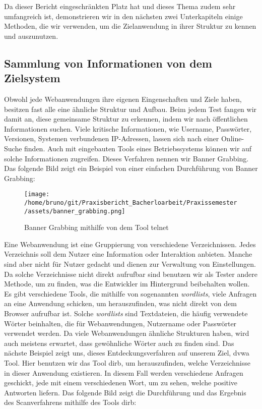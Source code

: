 Da dieser Bericht eingeschränkten Platz hat und dieses Thema zudem sehr umfangreich ist, demonstrieren wir in den nächsten zwei Unterkapiteln einige Methoden, die wir verwenden, um die Zielanwendung in ihrer Struktur zu kennen und auszunutzen.

\subsection{Sammlung von Informationen von dem Zielsystem}

Obwohl jede Webanwendungen ihre eigenen Eingenschaften und Ziele haben, besitzen fast alle eine ähnliche Struktur und Aufbau. Beim jedem Test fangen wir damit an, diese gemeinsame Struktur zu erkennen, indem wir nach öffentlichen Informationen suchen. Viele kritische Informationen, wie Username, Passwörter, Versionen, Systemen verbundenen IP-Adressen, lassen sich nach einer Online-Suche finden. Auch mit eingebauten Tools eines Betriebssystems können wir auf solche Informationen zugreifen. Dieses Verfahren nennen wir Banner Grabbing. Das folgende Bild zeigt ein Beispiel von einer einfachen Durchführung von Banner Grabbing:

\begin{figure}[H]
    \centering
    \texttt{[image: /home/bruno/git/Praxisbericht\_Bacherloarbeit/Praxissemester/assets/banner\_grabbing.png]}
    \caption{Banner Grabbing mithilfe von dem Tool telnet}
    \centering
\end{figure}

Eine Webanwendung ist eine Gruppierung von verschiedene Verzeichnissen. Jedes Verzeichnis soll dem Nutzer eine Information oder Interaktion anbieten. Manche sind aber nicht für Nutzer gedacht und dienen zur Verwaltung von Einstellungen. Da solche Verzeichnisse nicht direkt aufrufbar sind  benutzen wir als Tester andere Methode, um zu finden, was die Entwickler im Hintergrund beibehalten wollen. Es gibt verschiedene Tools, die mithilfe von sogenannten \textit{wordlists}, viele Anfragen an eine Anwendung schicken, um herauszufinden, was nicht direkt von dem Browser aufrufbar ist. Solche \textit{wordlists} sind Textdateien, die häufig verwendete Wörter beinhalten, die für Webanwendungen, Nutzername oder Passwörter verwendet werden. Da viele Webanwendungen ähnliche Strukturen haben, wird auch meistens erwartet, dass gewöhnliche Wörter auch zu finden sind. Das nächste Beispiel zeigt uns, dieses Entdeckungsverfahren auf unserem Ziel, \gls{dvwa} Tool. Hier benutzen wir das Tool \gls{dirb}, um herauszufinden, welche Verzeichnisse in dieser Anwendung existieren. In diesem Fall werden verschiedene Anfragen geschickt, jede mit einem verschiedenen Wort, um zu sehen, welche positive Antworten liefern. Das folgende Bild zeigt die Durchführung und das Ergebnis des Scanverfahrens mithilfe des Tools \gls{dirb}:

